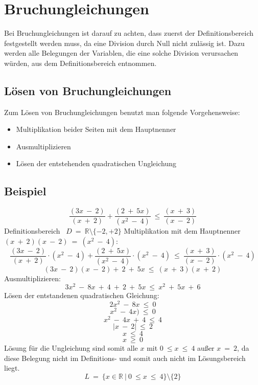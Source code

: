 \section{Bruchungleichungen}

Bei Bruchungleichungen ist darauf zu achten, dass zuerst der Definitionsbereich festgestellt werden muss, da eine Division durch Null nicht zulässig ist. Dazu werden alle Belegungen der Variablen, die eine solche Division verursachen würden, aus dem Definitionsbereich entnommen.

\subsection{Lösen von Bruchungleichungen}

Zum Lösen von Bruchungleichungen benutzt man folgende Vorgehensweise:
\begin{itemize}
\item Multiplikation beider Seiten mit dem Hauptnenner
\item Ausmultiplizieren
\item Lösen der entstehenden quadratischen Ungleichung
\end{itemize}

\subsection{Beispiel}

\[ \frac{(3x \ - \ 2)} {(x \ + \ 2)} + \frac{(2 \ + \ 5x)} {(x^2 \ - \ 4)} \ \leq \ \frac{(x \ + \ 3)} {(x \ - \ 2)}\]
Definitionsbereich \ $ D \ = \ \mathbb{R} \setminus \lbrace -2 , +2 \rbrace $
Multiplikation mit dem Hauptnenner $ (x \ + \ 2)(x \ - \ 2) \ = \ (x^2 \ - \ 4) $:
\[ \frac{(3x \ - \ 2)} {(x \ + \ 2)} \cdot (x^2 \ - \ 4) + \frac {(2 \ + \ 5x)} {(x^2 \ - \ 4)} \cdot (x^2 \ - \ 4) \ \leq \ \frac{(x \ + \ 3)} {(x \ - \ 2)} \cdot (x^2 \ - \ 4)\]
\[(3x \ - \ 2)(x \ - \ 2) + \ 2 \ + \ 5x \ \leq \ (x \ + \ 3)(x \ + \ 2)\]
Ausmultiplizieren:
\[3x^2 \ - \ 8x \ + \ 4 \ + \ 2 \ + \ 5x \ \leq \ x^2 \ + \ 5x \ + \ 6\]
Lösen der entstandenen quadratischen Gleichung:
\[ 2x^2 \ - \ 8x \ \leq \ 0 \]
\[ x^2 \ - \ 4x) \ \leq \ 0 \]
\[ x^2 \ - \ 4 x \ + \ 4 \ \leq \ 4 \]
\[ |x \ - \ 2| \ \leq \ 2 \]
\[x \ \leq \ 4 \]
\[ x \ \geq \ 0 \]
Lösung für die Ungleichung sind somit alle $ x $ mit $ 0 \ \leq x \ \leq \ 4 $ außer $ x \ = \ 2 $, da diese Belegung nicht im Definitions- und somit auch nicht im Lösungsbereich liegt.
\[L \ = \ \lbrace x \in \mathbb{R} \ | \ 0 \ \leq x \ \leq \ 4 \rbrace \setminus \lbrace 2 \rbrace\]

